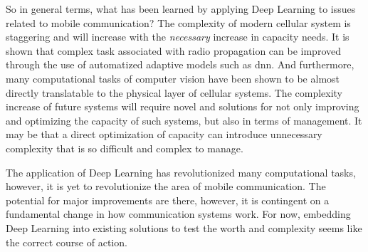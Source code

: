 So in general terms, what has been learned by applying Deep Learning to issues related to mobile communication? The complexity of modern cellular system is staggering and will increase with the \emph{necessary} increase in capacity needs. It is shown that complex task associated with radio propagation can be improved through the use of automatized adaptive models such as \gls{dnn}. And furthermore, many computational tasks of computer vision have been shown to be almost directly translatable to the physical layer of cellular systems. The complexity increase of future systems will require novel and solutions for not only improving and optimizing the capacity of such systems, but also in terms of management. It may be that a direct optimization of capacity can introduce unnecessary complexity that is so difficult and complex to manage.

The application of Deep Learning has revolutionized many computational tasks, however, it is yet to revolutionize the area of mobile communication. The potential for major improvements are there, however, it is contingent on a fundamental change in how communication systems work. For now, embedding Deep Learning into existing solutions to test the worth and complexity seems like the correct course of action.

